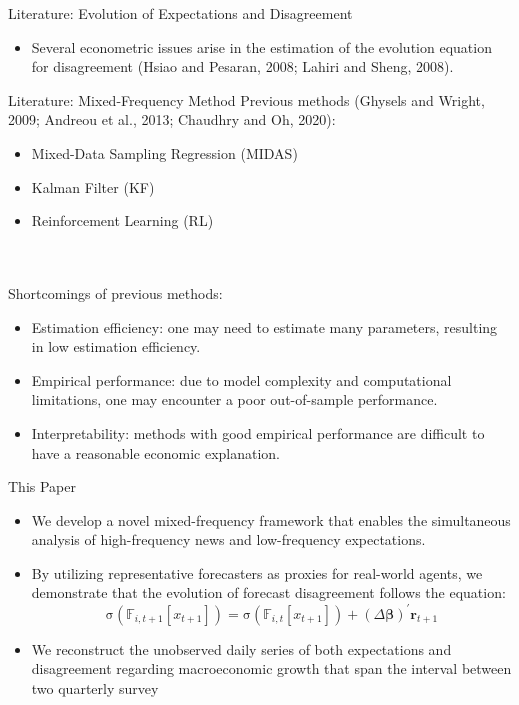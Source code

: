 \documentclass[UTF8, 10pt]{beamer}
\begin{document}
\begin{CJK*}{UTF8}{gbsn}
\begin{frame}{Literature: Evolution of Expectations and Disagreement}
\begin{itemize}
\begin{enumerate}
				\end{enumerate}
			\item Several \alert{econometric issues} arise in the estimation of the evolution equation for disagreement (Hsiao and Pesaran, 2008; Lahiri and Sheng, 2008).
		\end{itemize}
\end{frame}
\begin{frame}{Literature: Mixed-Frequency Method}
	Previous methods (Ghysels and Wright, 2009; Andreou et al., 2013; Chaudhry and Oh, 2020):
		\begin{itemize}
			\item Mixed-Data Sampling Regression (\alert{MIDAS})
			\item Kalman Filter (\alert{KF})
			\item Reinforcement Learning (\alert{RL})
		\end{itemize}
	\\\ \\
	Shortcomings of previous methods:
		\begin{itemize}
			\item \alert{Estimation efficiency}: one may need to estimate many parameters, resulting in low estimation efficiency.
			\item \alert{Empirical performance}: due to model complexity and computational limitations, one may encounter a poor out-of-sample performance.
			\item \alert{Interpretability}: methods with good empirical performance are difficult to have a reasonable economic explanation.
		\end{itemize}
\end{frame}
\begin{frame}{This Paper}
	\begin{itemize}
		\item We develop a novel \alert{mixed-frequency} framework that enables the simultaneous analysis of \alert{high-frequency news} and \alert{low-frequency expectations}.
		\item By utilizing \alert{representative forecasters} as proxies for real-world agents, we demonstrate that the \alert{evolution of forecast disagreement} follows the equation:
			$$\mathrm{\sigma}\left(\mathbb{F}_{i, t+1}\left[x_{t+1}\right]\right)
					=  \mathrm{\sigma}\left(\mathbb{F}_{i, t}\left[x_{t+1}\right]\right)
					+ (\Delta\boldsymbol{\beta})^{\prime}\mathbf{r}_{t+1}
			$$
		\item We \alert{reconstruct the unobserved daily series of both expectations and disagreement} regarding macroeconomic growth that span the interval between two quarterly survey

\end{itemize}
\end{frame}
\end{CJK*}
\end{document}
